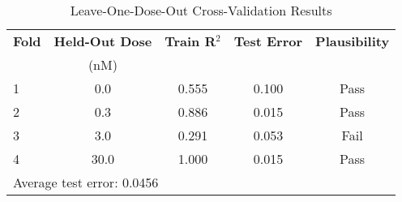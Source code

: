 
\begin{table}[htbp]
\centering
\caption{Leave-One-Dose-Out Cross-Validation Results}
\label{tab:exp2_cross_validation}
\begin{tabular}{lcccc}
\hline
\textbf{Fold} & \textbf{Held-Out Dose} & \textbf{Train R$^2$} & \textbf{Test Error} & \textbf{Plausibility} \\
 & (nM) & & & \\
\hline
1 & 0.0 & 0.555 & 0.100 & Pass \\
2 & 0.3 & 0.886 & 0.015 & Pass \\
3 & 3.0 & 0.291 & 0.053 & Fail \\
4 & 30.0 & 1.000 & 0.015 & Pass \\
\hline
\multicolumn{5}{l}{\small Average test error: 0.0456} \\
\end{tabular}
\end{table}
